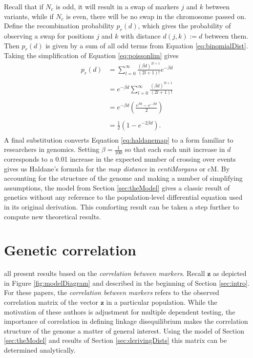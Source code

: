 \documentclass{article}
\newcommand{\ve}[1]{\mathbf{#1}}           %
\begin{document}
Recall that if $N_c$ is odd, it will result in a swap of markers $j$ and $k$ between variants, while if $N_c$ is even, there will be no swap in the chromosome passed on. Define the recombination probability $p_r(d)$, which gives the probability of observing a swap for positions $j$ and $k$ with distance $d(j,k) := d$ between them. Then $p_r(d)$ is given by a sum of all odd terms from Equation \ref{eq:binomialDist}. Taking the simplification of Equation \ref{eq:poissonlim} gives
\begin{equation} \label{eq:haldanemap}
  \begin{split}
    p_r(d) & = \sum_{l = 0}^{\infty} \frac{(\beta d)^{2l + 1}}{(2l + 1)!} e^{-\beta d} \\
    & \\
    & = e^{-\beta d} \sum_{l = 0}^{\infty} \frac{(\beta d)^{2l + 1}}{(2l + 1)!} \\
    & \\
    & = e^{-\beta d} \left ( \frac{e^{\beta d} - e^{- \beta d}}{2} \right ) \\
    & \\
    & = \frac{1}{2} \left ( 1 - e^{-2 \beta d} \right ) .\\
  \end{split}
\end{equation}
A final substitution converts Equation \ref{eq:haldanemap} to a form familiar to researchers in genomics. Setting $\beta = \frac{1}{100}$ so that each each unit increase in $d$ corresponds to a 0.01 increase in the expected number of crossing over events gives us Haldane's formula for the \textit{map distance} in \textit{centiMorgans} or cM. By accounting for the structure of the genome and making a number of simplifying assumptions, the model from Section \ref{sec:theModel} gives a classic result of genetics without any reference to the population-level differential equation used in its original derivation. This comforting result can be taken a step further to compute new theoretical results. 

\section{Genetic correlation} \label{sec:correlation}

\cite{cheverud2001, LiJi2005, Galwey2009} all present results based on the \emph{correlation between markers}. Recall $\ve{z}$ as depicted in Figure \ref{fig:modelDiagram} and described in the beginning of Section \ref{sec:intro}. For these papers, the \emph{correlation between markers} refers to the observed correlation matrix of the vector $\ve{z}$ in a particular population. While the motivation of these authors is adjustment for multiple dependent testing, the importance of correlation in defining linkage disequilibrium makes the correlation structure of the genome a matter of general interest. Using the model of Section \ref{sec:theModel} and results of Section \ref{sec:derivingDists} this matrix can be determined analytically.
\end{document}
